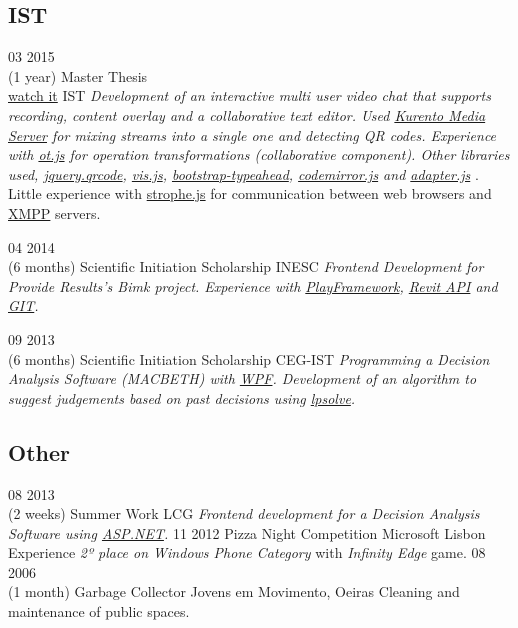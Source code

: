 \documentclass[]{friggeri-cv}
\begin{document}
	\subsection{IST}  
		\begin{entrylist}

			\entry
			{03 2015\\(1 year)}
			{Master Thesis \\\href{https://www.youtube.com/watch?v=TWfbcBKbseA}{watch it}}
			{IST}
			{\emph{Development of an interactive multi user video chat that supports recording, content overlay and a collaborative text editor. Used \underline{Kurento Media Server} for mixing streams into a single one and detecting QR codes. Experience with \underline{ot.js} for operation transformations (collaborative component). Other libraries used, \underline{jquery.qrcode}, \underline{vis.js}, \underline{bootstrap-typeahead}, \underline{codemirror.js} and \underline{adapter.js} }. Little experience with \underline{strophe.js} for communication between web browsers and \underline{XMPP} servers. }
			
			\entry
			{04 2014\\(6 months)}
			{Scientific Initiation Scholarship}
			{INESC}
			{\emph{Frontend Development for Provide Results's Bimk project. Experience with \underline{PlayFramework}, \underline{Revit API} and \underline{GIT}.}}
			
			\entry
			{09 2013\\(6 months)}
			{Scientific Initiation Scholarship}
			{CEG-IST}
			{\emph{Programming a Decision Analysis Software (MACBETH) with \underline{WPF}. Development of an algorithm to suggest judgements based on past decisions using \underline{lpsolve}.}}

		\end{entrylist}

\subsection{Other}  
	\begin{entrylist}

		\entry
		{08 2013\\(2 weeks)}
		{Summer Work}
		{LCG}
		{\emph{Frontend development for a Decision Analysis Software using \underline{ASP.NET}. }}
		\entry
		{11 2012}
		{Pizza Night Competition}
		{Microsoft Lisbon Experience}
		{\emph{2º place on Windows Phone Category} with \emph{Infinity Edge} game.}
		\entry
		{08 2006\\(1 month)}
		{Garbage Collector}
		{Jovens em Movimento, Oeiras}
		{Cleaning and maintenance of public spaces.}


		\end{entrylist}
\end{document}
